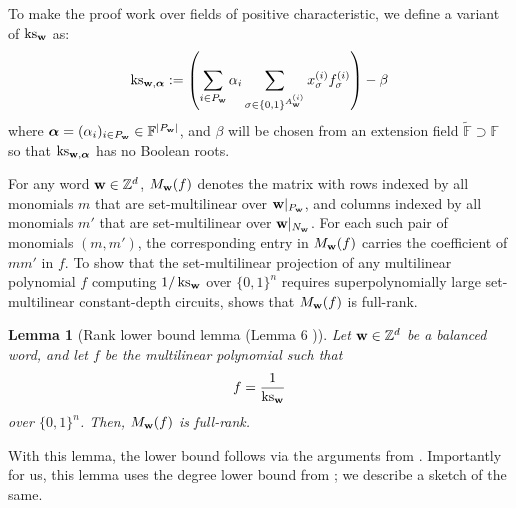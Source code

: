 \documentclass[11pt]{article}
\newtheorem{lemma}[theorem]{Lemma}
\newcommand{\Boo}{\{0,1 \}}
\newcommand{\F}{\mathbb{F}}
\begin{document}
To make the proof work over fields of positive characteristic, we define a variant of $\operatorname{ks}_{\mathbf{w}}$ as:
\begin{equation}
    \kswnew{\bfalpha}:= \left ( \sum_{i\in P_\bfw}\alpha_i\sum_{\sigma \in \Boo^{\Aw^{(i)}}} x_{\sigma}^{(i)}f_\sigma^{(i)} \right ) - \beta
\end{equation}    
where $\bfalpha = (\alpha_i)_{i\in P_\bfw} \in \F^{|P_\bfw|}$, and $\beta$ will be chosen from an extension field $\tilde{\F} \supset \F$ so that $\operatorname{ks}_{\mathbf{w},\boldsymbol{\alpha}}$ has no Boolean roots. 

For any word $\mathbf{w} \in \mathbb{Z}^d$, $M_{\mathbf{w}}(f)$ denotes the matrix with rows indexed by all monomials $m$ that are set-multilinear over $\mathbf{w}|_{P_{\mathbf{w}}}$, and columns indexed by all monomials $m'$ that are set-multilinear over $\mathbf{w}|_{N_{\mathbf{w}}}$. For each such pair of monomials $(m,m')$, the corresponding entry in $M_{\mathbf{w}}(f)$ carries the coefficient of $mm'$ in $f$. To show that the set-multilinear projection of any multilinear polynomial $f$ computing $1/\operatorname{ks}_{\mathbf{w}}$ over $\Boo^n$ requires superpolynomially large set-multilinear constant-depth circuits, \cite{GHT} shows that $M_{\mathbf{w}}(f)$ is full-rank.
\begin{lemma}[Rank lower bound lemma (Lemma 6 \cite{GHT})]\label{lem: ght rank lower bound}
    Let $\mathbf{w} \in \mathbb{Z}^d$ be a balanced word, and let $f$ be the multilinear polynomial such that $$f = \frac{1}{\operatorname{ks}_{\mathbf{w}}}$$
    over $\Boo^n$. Then, $M_{\mathbf{w}}(f)$ is full-rank.
\end{lemma}
With this lemma, the lower bound follows via the arguments from \cite{LST}. Importantly for us, this lemma uses the degree lower bound from \cite{FSTW21}; we describe a sketch of the same. 
\end{document}
